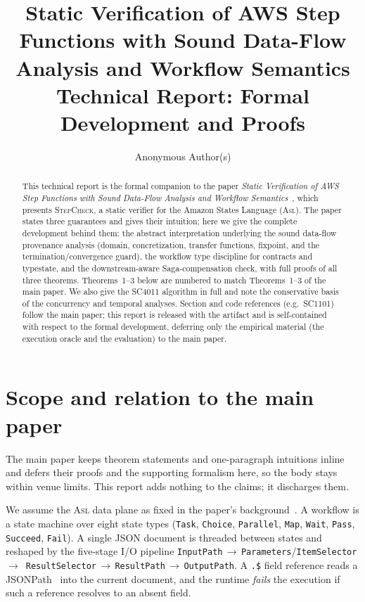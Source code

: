 \documentclass[11pt]{article}
\title{\textbf{Static Verification of AWS Step Functions with Sound
Data-Flow Analysis and Workflow Semantics}\\[4pt]\large Technical Report:
Formal Development and Proofs}
\author{Anonymous Author(s)}
\date{}
\newcommand{\code}[1]{\textsf{\small #1}}
\newcommand{\tool}{\textsc{StepCheck}}
\newcommand{\asl}{\textsc{Asl}}
\theoremstyle{plain}
\theoremstyle{definition}
\theoremstyle{remark}
\begin{document}
\maketitle

\begin{abstract}
This technical report is the formal companion to the paper \emph{Static Verification of
AWS Step Functions with Sound Data-Flow Analysis and Workflow Semantics}~\cite{stepcheck},
which presents \tool, a static verifier for the Amazon States Language (\asl). The paper
states three guarantees and gives their intuition; here we give the complete development
behind them: the abstract interpretation underlying the sound data-flow provenance analysis
(domain, concretization, transfer functions, fixpoint, and the termination/convergence
guard), the workflow type discipline for contracts and typestate, and the downstream-aware
Saga-compensation check, with full proofs of all three theorems. Theorems~1--3 below are
numbered to match Theorems~1--3 of the main paper. We also give the \code{SC4011} algorithm
in full and note the conservative basis of the concurrency and temporal analyses. Section
and code references (e.g.\ \code{SC1101}) follow the main paper; this report is released with
the artifact and is self-contained with respect to the formal development, deferring only
the empirical material (the execution oracle and the evaluation) to the main paper.
\end{abstract}

\tableofcontents

\section{Scope and relation to the main paper}
\label{sec:scope}

The main paper keeps theorem statements and one-paragraph intuitions inline and defers their
proofs and the supporting formalism here, so the body stays within venue limits. This report
adds nothing to the claims; it discharges them.

We assume the \asl{} data plane as fixed in the paper's background~\cite{awsasl}. A workflow
is a state machine over eight state types (\texttt{Task}, \texttt{Choice}, \texttt{Parallel},
\texttt{Map}, \texttt{Wait}, \texttt{Pass}, \texttt{Succeed}, \texttt{Fail}). A single JSON
document is threaded between states and reshaped by the five-stage I/O pipeline
\texttt{InputPath}\,$\to$\,\texttt{Parameters}/\texttt{ItemSelector}\,$\to$\,%
\texttt{ResultSelector}\,$\to$\,\texttt{ResultPath}\,$\to$\,\texttt{OutputPath}. A
\texttt{.\$} field reference reads a JSONPath~\cite{jsonpath} into the current document, and
the runtime \emph{fails} the execution if such a reference resolves to an absent field.
\end{document}
